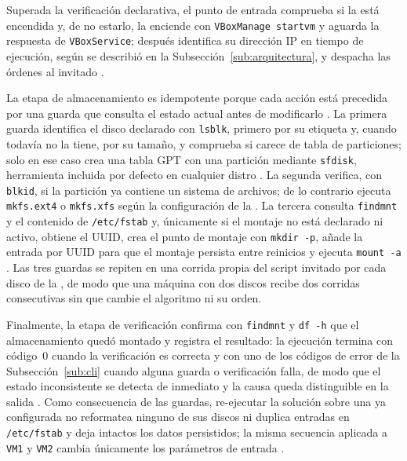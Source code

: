 Superada la verificación declarativa, el punto de entrada comprueba si la \vm{} está encendida y, de no estarlo, la enciende con \texttt{VBoxManage startvm} y aguarda la respuesta de \texttt{VBoxService}; después identifica su dirección IP en tiempo de ejecución, según se describió en la Subsección~\ref{sub:arquitectura}, y despacha las órdenes al invitado \parencite{virtualbox_guestcontrol, virtualbox_guestadditions}.

La etapa de almacenamiento es idempotente porque cada acción está precedida por una guarda que consulta el estado actual antes de modificarlo \parencite{idempotency_concept}. La primera guarda identifica el disco declarado con \texttt{lsblk}, primero por su etiqueta y, cuando todavía no la tiene, por su tamaño, y comprueba si carece de tabla de particiones; solo en ese caso crea una tabla GPT con una partición mediante \texttt{sfdisk}, herramienta incluida por defecto en cualquier distro \parencite{linux_storage_management}. La segunda verifica, con \texttt{blkid}, si la partición ya contiene un sistema de archivos; de lo contrario ejecuta \texttt{mkfs.ext4} o \texttt{mkfs.xfs} según la configuración de la \vm{}. La tercera consulta \texttt{findmnt} y el contenido de \texttt{/etc/fstab} y, únicamente si el montaje no está declarado ni activo, obtiene el UUID, crea el punto de montaje con \texttt{mkdir -p}, añade la entrada por UUID para que el montaje persista entre reinicios y ejecuta \texttt{mount -a} \parencite{uuid_fstab, lsb_fhs}. Las tres guardas se repiten en una corrida propia del script invitado por cada disco de la \vm{}, de modo que una máquina con dos discos recibe dos corridas consecutivas sin que cambie el algoritmo ni su orden.

Finalmente, la etapa de verificación confirma con \texttt{findmnt} y \texttt{df -h} que el almacenamiento quedó montado y registra el resultado: la ejecución termina con código~0 cuando la verificación es correcta y con uno de los códigos de error de la Subsección~\ref{sub:cli} cuando alguna guarda o verificación falla, de modo que el estado inconsistente se detecta de inmediato y la causa queda distinguible en la salida \parencite{bash_best_practices}. Como consecuencia de las guardas, re-ejecutar la solución sobre una \vm{} ya configurada no reformatea ninguno de sus discos ni duplica entradas en \texttt{/etc/fstab} y deja intactos los datos persistidos; la misma secuencia aplicada a \texttt{VM1} y \texttt{VM2} cambia únicamente los parámetros de entrada \parencite{idempotency_concept, ansible_up_running}.


